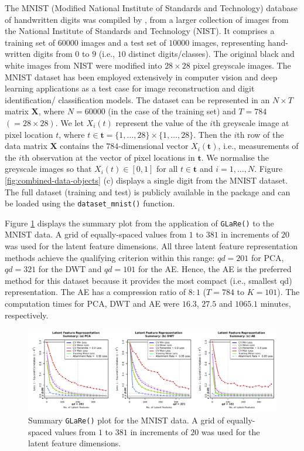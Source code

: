 The MNIST (Modified National Institute of Standards and Technology) database of handwritten digits was compiled by \textcite{lecun_mnist_1998}, from a larger collection of images from the National Institute of Standards and Technology (NIST).
It comprises a training set of $60000$ images and a test set of $10000$ images, representing hand-written digits from $0$ to $9$ (i.e., $10$ distinct digits/classes).
The original black and white images from NIST were modified into $28 \times 28$ pixel greyscale images.
The MNIST dataset has been employed extensively in computer vision and deep learning applications as a test case for image reconstruction and digit identification/ classification models.
The dataset can be represented in an $N \times T$ matrix $\mathbf{X}$, where $N = 60000$ (in the case of the training set) and $T= 784$ $(= 28 \times 28)$.
We let $X_i(t)$ represent the value of the $i$th greyscale image at pixel location $t$, where $t \in \mathbf{t} = \{1, \dots, 28\} \times \{1, \dots, 28\}$.
Then the $i$th row of the data matrix $\mathbf{X}$ contains the $784$-dimensional vector $X_i(\mathbf{t})$, i.e., measurements of the $i$th observation at the vector of pixel locations in $\mathbf{t}$.
We normalise the greyscale images so that $X_i(t) \in [0, 1]$ for all $t \in \mathbf{t}$ and $i = 1, \dots, N$. 
Figure \ref{fig:combined-data-objects} (c) displays a single digit from the MNIST dataset.
The full dataset (training and test) is publicly available in the   package \parencite{kalinowski_keras_2024} and can be loaded using the \texttt{dataset\_mnist()} function.

Figure \ref{fig:mnist-results} displays the summary plot from the application of \texttt{GLaRe()} to the MNIST data.
A grid of equally-spaced values from $1$ to $381$ in increments of $20$ was used for the latent feature dimensions.
All three latent feature representation methods achieve the qualifying criterion within this range: $qd = 201$ for PCA, $qd = 321$ for the DWT and $qd = 101$ for the AE.
Hence, the AE is the preferred method for this dataset because it provides the most compact (i.e., smallest qd) representation.
The AE has a compression ratio of $8:1$ ($T = 784$ to $K = 101$).
The computation times for PCA, DWT and AE were $16.3$, $27.5$ and $1065.1$ minutes, respectively.

\begin{figure}
    \centering
    \includegraphics[width=1\textwidth]{figures/mnist-results.pdf}
    \caption{Summary \texttt{GLaRe()} plot for the MNIST data. A grid of equally-spaced values from $1$ to $381$ in increments of $20$ was used for the latent feature dimensions.}
    \label{fig:mnist-results}
\end{figure}


